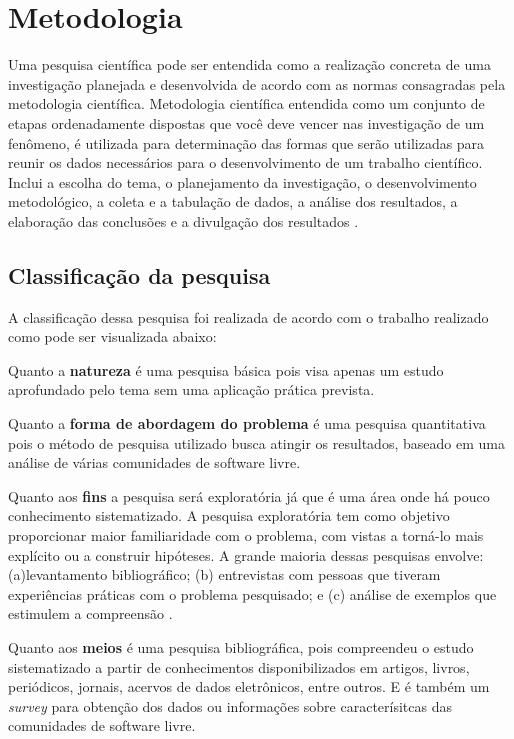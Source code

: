 \chapter{Metodologia}
\label{metodologia}

Uma pesquisa científica pode ser entendida como a realização concreta de uma investigação planejada e desenvolvida de acordo com as normas consagradas pela metodologia científica. Metodologia científica entendida como um conjunto de etapas ordenadamente dispostas que você deve vencer nas investigação de um fenômeno, é utilizada para determinação das formas que serão utilizadas para reunir os dados necessários para o desenvolvimento de um trabalho científico. Inclui a escolha do tema, o planejamento da investigação, o desenvolvimento metodológico, a coleta e a tabulação de dados, a análise dos resultados, a elaboração das conclusões e a divulgação dos resultados \cite{moresi2003metodologia}.

\section{Classificação da pesquisa}
\label{class-da-pesquisa}
A classificação dessa pesquisa foi realizada de acordo com o trabalho realizado  como pode ser visualizada abaixo:

Quanto a \textbf{natureza} é uma pesquisa básica pois visa apenas um estudo aprofundado pelo tema sem uma aplicação prática prevista.

Quanto a \textbf{forma de abordagem do problema} é uma pesquisa quantitativa pois o método de pesquisa utilizado busca atingir os resultados, baseado em uma análise de várias comunidades de software livre.

Quanto aos \textbf{fins} a pesquisa será exploratória já que é uma área onde há pouco conhecimento sistematizado. A pesquisa exploratória tem como objetivo proporcionar maior familiaridade com o problema, com vistas a torná-lo mais explícito ou a construir hipóteses. A grande maioria dessas pesquisas envolve: (a)levantamento bibliográfico; (b) entrevistas com pessoas que tiveram experiências práticas com o problema pesquisado; e (c) análise de exemplos que estimulem a compreensão \cite{gil2002}.

Quanto aos \textbf{meios} é uma pesquisa bibliográfica, pois compreendeu o estudo sistematizado a partir de conhecimentos disponibilizados em artigos, livros, periódicos, jornais, acervos de dados eletrônicos, entre outros. E é também um \emph{survey} para obtenção dos dados ou informações sobre caracterísitcas das comunidades de software livre.

